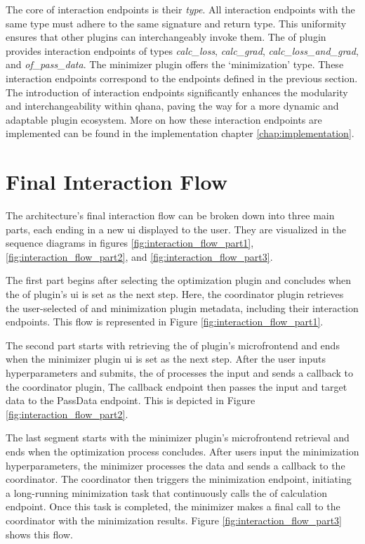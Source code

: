 \documentclass[
  a4paper,  %
  twoside,  %
  bibliography=totoc,
  headsepline,
  cleardoublepage=empty,
  parskip=half,
  draft=false
]{scrbook}
\begin{document}
The core of interaction endpoints is their \emph{type}.
All interaction endpoints with the same type must adhere to the same signature and return type.
This uniformity ensures that other plugins can interchangeably invoke them.
The \gls{of} plugin provides interaction endpoints of types \emph{calc\_loss}, \emph{calc\_grad}, \emph{calc\_loss\_and\_grad}, and \emph{of\_pass\_data}.
The minimizer plugin offers the `minimization' type.
These interaction endpoints correspond to the endpoints defined in the previous section.
The introduction of interaction endpoints significantly enhances the modularity and interchangeability within \gls{qhana}, paving the way for a more dynamic and adaptable plugin ecosystem.
More on how these interaction endpoints are implemented can be found in the implementation chapter \ref{chap:implementation}.

\section{Final Interaction Flow}
The architecture's final interaction flow can be broken down into three main parts, each ending in a new \gls{ui} displayed to the user.
They are visualized in the sequence diagrams in figures \ref{fig:interaction_flow_part1}, \ref{fig:interaction_flow_part2}, and \ref{fig:interaction_flow_part3}.

The first part begins after selecting the optimization plugin and concludes when the \gls{of} plugin's \gls{ui} is set as the next step.
Here, the coordinator plugin retrieves the user-selected \gls{of} and minimization plugin metadata, including their interaction endpoints.
This flow is represented in Figure \ref{fig:interaction_flow_part1}.

The second part starts with retrieving the \gls{of} plugin's microfrontend and ends when the minimizer plugin \gls{ui} is set as the next step.
After the user inputs hyperparameters and submits, the \gls{of} processes the input and sends a callback to the coordinator plugin,
The callback endpoint then passes the input and target data to the PassData endpoint.
This is depicted in Figure \ref{fig:interaction_flow_part2}.

The last segment starts with the minimizer plugin's microfrontend retrieval and ends when the optimization process concludes.
After users input the minimization hyperparameters, the minimizer processes the data and sends a callback to the coordinator.
The coordinator then triggers the minimization endpoint, initiating a long-running minimization task that continuously calls the \gls{of} calculation endpoint.
Once this task is completed, the minimizer makes a final call to the coordinator with the minimization results.
Figure \ref{fig:interaction_flow_part3} shows this flow.
\end{document}
